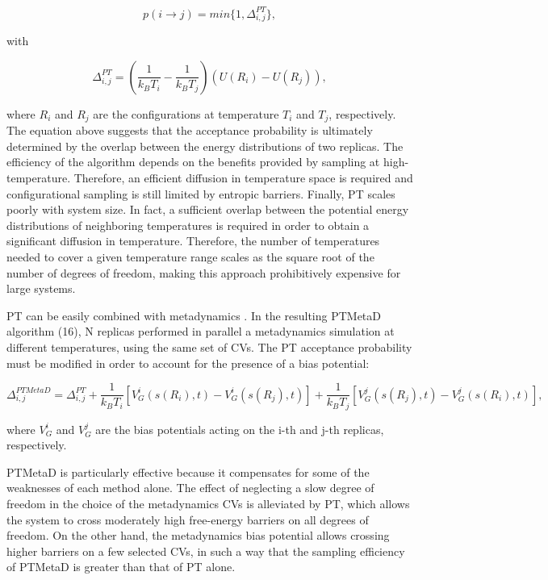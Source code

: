 \[ p(i \rightarrow j) = min \{ 1,\Delta_{i,j}^{PT} \}, \]

with

\[ \Delta_{i,j}^{PT} = \left ( \frac{1}{k_B T_i}-\frac{1}{k_B T_j} \right ) \left( U(R_i) - U(R_j) \right ), \]

where $ R_i $ and $ R_j $ are the configurations at temperature $ T_i $ and $ T_j $, respectively. The equation above suggests that the acceptance probability is ultimately determined by the overlap between the energy distributions of two replicas. The efficiency of the algorithm depends on the benefits provided by sampling at high-\/temperature. Therefore, an efficient diffusion in temperature space is required and configurational sampling is still limited by entropic barriers. Finally, P\+T scales poorly with system size. In fact, a sufficient overlap between the potential energy distributions of neighboring temperatures is required in order to obtain a significant diffusion in temperature. Therefore, the number of temperatures needed to cover a given temperature range scales as the square root of the number of degrees of freedom, making this approach prohibitively expensive for large systems.

P\+T can be easily combined with metadynamics \cite{bussi_xc}. In the resulting P\+T\+Meta\+D algorithm (16), N replicas performed in parallel a metadynamics simulation at different temperatures, using the same set of C\+Vs. The P\+T acceptance probability must be modified in order to account for the presence of a bias potential\+:

\[ \Delta_{i,j}^{PTMetaD} = \Delta_{i,j}^{PT} + \frac{1}{k_B T_i} \left [ V_G^{i}(s(R_i),t) - V_G^{i}(s(R_j),t) \right ] + \frac{1}{k_B T_j} \left [ V_G^{j}(s(R_j),t) - V_G^{j}(s(R_i),t) \right ], \]

where $ V_G^{i} $ and $ V_G^{j} $ are the bias potentials acting on the i-\/th and j-\/th replicas, respectively.

P\+T\+Meta\+D is particularly effective because it compensates for some of the weaknesses of each method alone. The effect of neglecting a slow degree of freedom in the choice of the metadynamics C\+Vs is alleviated by P\+T, which allows the system to cross moderately high free-\/energy barriers on all degrees of freedom. On the other hand, the metadynamics bias potential allows crossing higher barriers on a few selected C\+Vs, in such a way that the sampling efficiency of P\+T\+Meta\+D is greater than that of P\+T alone.

